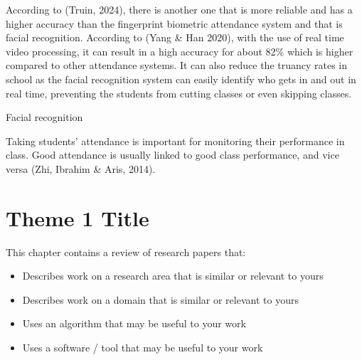 According to (Truin, 2024), there is another one that is more reliable and has a higher accuracy than the fingerprint biometric attendance system and that is facial recognition. According to (Yang \& Han 2020), with the use of real time video processing, it can result in a high accuracy for about 82\% which is higher compared to other attendance systems. It can also reduce the truancy rates in school as the facial recognition system can easily identify who gets in and out in real time, preventing the students from cutting classes or even skipping classes.

Facial recognition 

Taking students' attendance is important for monitoring their performance in class. Good attendance is usually linked to good class performance, and vice versa (Zhi, Ibrahim \& Aris, 2014).



\begin{comment}

%
%
Guide on Writing your RRL chapter
 
1. Identify the keywords with respect to your research
      One keyword = One document section
                Examples: 2.1 Story Generation Systems
			 2.2 Knowledge Representation

2.  Find references using these keywords

3.  For each of the references that you find,
        Check: Is it relevant to your research?
        Use their references to find more relevant works.

4. Identify a set of criteria for comparison.
       It will serve as a guide to help you focus on what to look for

5. Write a summary focusing on -
       What: A short description of the work
       How: A summary of the approach it utilized
       Findings: If applicable, provide the results
        Why: Relevance to your work

6. At the end of each section,  show a Table of Comparison of the related works 
   and your proposed project/system

\end{comment}

\section{Theme 1 Title}
This chapter  contains a review of research papers that:
%
%
\begin{itemize}
\item Describes work on a research area that is similar or relevant to yours
\item Describes work on a domain that is similar or relevant to yours
\item Uses an algorithm that may be useful to your work
\item Uses a software / tool that may be useful to your work
\end{itemize}

